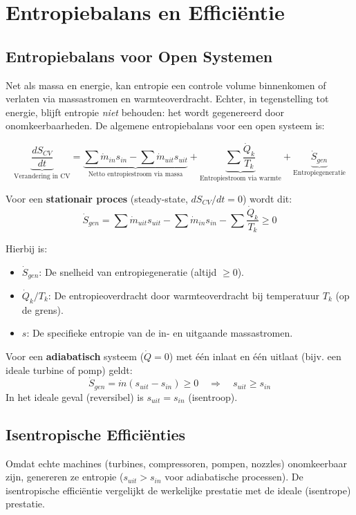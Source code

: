 \documentclass[a4paper,11pt,twoside]{report}
\begin{document}
\section{Entropiebalans en Efficiëntie}

\subsection{Entropiebalans voor Open Systemen}
Net als massa en energie, kan entropie een controle volume binnenkomen of verlaten via massastromen en warmteoverdracht. Echter, in tegenstelling tot energie, blijft entropie \textit{niet} behouden: het wordt gegenereerd door onomkeerbaarheden. De algemene entropiebalans voor een open systeem is:

\[
\underbrace{\frac{dS_{CV}}{dt}}_{\text{Verandering in CV}} = \underbrace{\sum \dot{m}_{in} s_{in} - \sum \dot{m}_{uit} s_{uit}}_{\text{Netto entropiestroom via massa}} + \underbrace{\sum \frac{\dot{Q}_k}{T_k}}_{\text{Entropiestroom via warmte}} + \underbrace{\dot{S}_{gen}}_{\text{Entropiegeneratie}}
\]

Voor een \textbf{stationair proces} (steady-state, $dS_{CV}/dt = 0$) wordt dit:
\[
\dot{S}_{gen} = \sum \dot{m}_{uit} s_{uit} - \sum \dot{m}_{in} s_{in} - \sum \frac{\dot{Q}_k}{T_k} \geq 0
\]

Hierbij is:
\begin{itemize}
    \item $\dot{S}_{gen}$: De snelheid van entropiegeneratie (altijd $\geq 0$).
    \item $\dot{Q}_k/T_k$: De entropieoverdracht door warmteoverdracht bij temperatuur $T_k$ (op de grens).
    \item $s$: De specifieke entropie van de in- en uitgaande massastromen.
\end{itemize}

Voor een \textbf{adiabatisch} systeem ($\dot{Q}=0$) met één inlaat en één uitlaat (bijv. een ideale turbine of pomp) geldt:
\[
\dot{S}_{gen} = \dot{m}(s_{uit} - s_{in}) \geq 0 \quad \Rightarrow \quad s_{uit} \geq s_{in}
\]
In het ideale geval (reversibel) is $s_{uit} = s_{in}$ (isentroop).

\subsection{Isentropische Efficiënties}
Omdat echte machines (turbines, compressoren, pompen, nozzles) onomkeerbaar zijn, genereren ze entropie ($s_{uit} > s_{in}$ voor adiabatische processen). De isentropische efficiëntie vergelijkt de werkelijke prestatie met de ideale (isentrope) prestatie.
\end{document}
